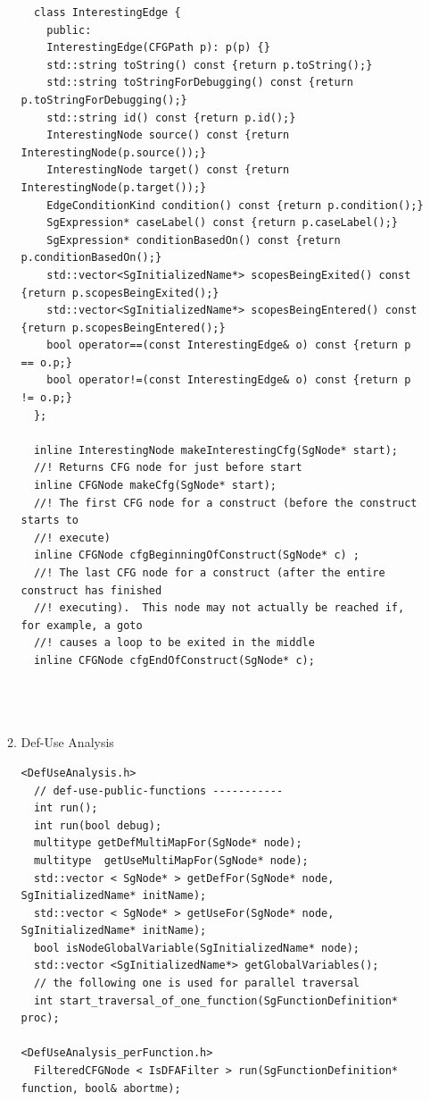 \begin{enumerate}
\begin{enumerate}
\begin{lstlisting}
  class InterestingEdge {
    public:
    InterestingEdge(CFGPath p): p(p) {}
    std::string toString() const {return p.toString();}
    std::string toStringForDebugging() const {return p.toStringForDebugging();}
    std::string id() const {return p.id();}
    InterestingNode source() const {return InterestingNode(p.source());}
    InterestingNode target() const {return InterestingNode(p.target());}
    EdgeConditionKind condition() const {return p.condition();}
    SgExpression* caseLabel() const {return p.caseLabel();}
    SgExpression* conditionBasedOn() const {return p.conditionBasedOn();}
    std::vector<SgInitializedName*> scopesBeingExited() const {return p.scopesBeingExited();}
    std::vector<SgInitializedName*> scopesBeingEntered() const {return p.scopesBeingEntered();}
    bool operator==(const InterestingEdge& o) const {return p == o.p;}
    bool operator!=(const InterestingEdge& o) const {return p != o.p;}
  };

  inline InterestingNode makeInterestingCfg(SgNode* start);
  //! Returns CFG node for just before start
  inline CFGNode makeCfg(SgNode* start);
  //! The first CFG node for a construct (before the construct starts to
  //! execute)
  inline CFGNode cfgBeginningOfConstruct(SgNode* c) ;
  //! The last CFG node for a construct (after the entire construct has finished
  //! executing).  This node may not actually be reached if, for example, a goto
  //! causes a loop to be exited in the middle
  inline CFGNode cfgEndOfConstruct(SgNode* c);




      \end{lstlisting}

      \item Def-Use Analysis
      \begin{lstlisting}
<DefUseAnalysis.h>
  // def-use-public-functions -----------
  int run();
  int run(bool debug);
  multitype getDefMultiMapFor(SgNode* node);
  multitype  getUseMultiMapFor(SgNode* node);
  std::vector < SgNode* > getDefFor(SgNode* node, SgInitializedName* initName);
  std::vector < SgNode* > getUseFor(SgNode* node, SgInitializedName* initName);
  bool isNodeGlobalVariable(SgInitializedName* node);
  std::vector <SgInitializedName*> getGlobalVariables();
  // the following one is used for parallel traversal
  int start_traversal_of_one_function(SgFunctionDefinition* proc);

<DefUseAnalysis_perFunction.h>
  FilteredCFGNode < IsDFAFilter > run(SgFunctionDefinition* function, bool& abortme);


\end{lstlisting}
\end{enumerate}
\end{enumerate}
